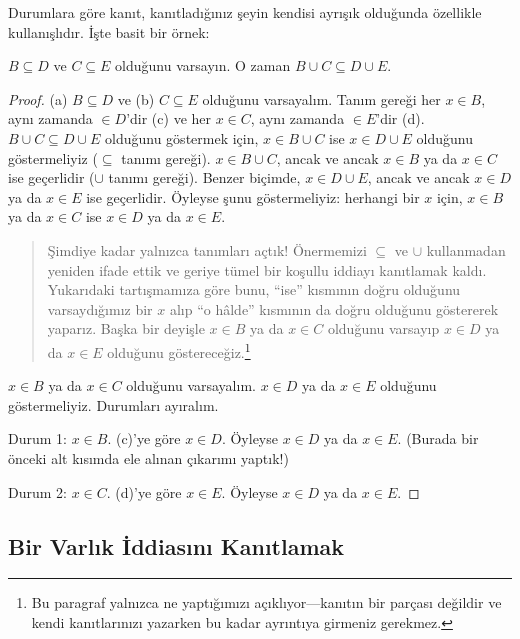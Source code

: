 \documentclass[../../../include/open-logic-section]{subfiles}
\begin{document}
Durumlara göre kanıt, kanıtladığınız şeyin kendisi ayrışık olduğunda
özellikle kullanışlıdır. İşte basit bir örnek:

\begin{prop}
$B \subseteq D$ ve $C \subseteq E$ olduğunu varsayın. O zaman $B \cup C
\subseteq D \cup E$.
\end{prop}

\begin{proof}
  (a) $B \subseteq D$ ve (b) $C \subseteq E$ olduğunu varsayalım. Tanım
  gereği her $x \in B$, aynı zamanda $\in D$'dir (c) ve her $x \in C$,
  aynı zamanda $\in E$'dir (d). $B \cup C \subseteq D \cup E$ olduğunu
  göstermek için, $x \in B \cup C$ ise $x \in D \cup E$ olduğunu
  göstermeliyiz ($\subseteq$ tanımı gereği). $x \in B \cup C$, ancak ve
  ancak $x \in B$ ya da $x \in C$ ise geçerlidir ($\cup$ tanımı gereği).
  Benzer biçimde, $x \in D \cup E$, ancak ve ancak $x \in D$ ya da $x
  \in E$ ise geçerlidir. Öyleyse şunu göstermeliyiz: herhangi bir $x$
  için, $x \in B$ ya da $x \in C$ ise $x \in D$ ya da $x \in E$.

  \begin{quote}
  Şimdiye kadar yalnızca tanımları açtık!{} Önermemizi $\subseteq$ ve
  $\cup$ kullanmadan yeniden ifade ettik ve geriye tümel bir koşullu
  iddiayı kanıtlamak kaldı. Yukarıdaki tartışmamıza göre bunu, ``ise''
  kısmının doğru olduğunu varsaydığımız bir $x$ alıp ``o hâlde''
  kısmının da doğru olduğunu göstererek yaparız. Başka bir deyişle $x
  \in B$ ya da $x \in C$ olduğunu varsayıp $x \in D$ ya da $x \in E$
  olduğunu göstereceğiz.\footnote{Bu paragraf yalnızca ne yaptığımızı
    açıklıyor---kanıtın bir parçası değildir ve kendi kanıtlarınızı
    yazarken bu kadar ayrıntıya girmeniz gerekmez.}
  \end{quote}

  $x \in B$ ya da $x \in C$ olduğunu varsayalım. $x \in D$ ya da $x \in
  E$ olduğunu göstermeliyiz. Durumları ayıralım.

  Durum 1: $x \in B$. (c)'ye göre $x \in D$. Öyleyse $x \in D$ ya da
  $x \in E$. (Burada bir önceki alt kısımda ele alınan çıkarımı yaptık!)

  Durum 2: $x \in C$. (d)'ye göre $x \in E$. Öyleyse $x \in D$ ya da
  $x \in E$.
 \end{proof}


\subsection{Bir Varlık İddiasını Kanıtlamak}
\end{document}
